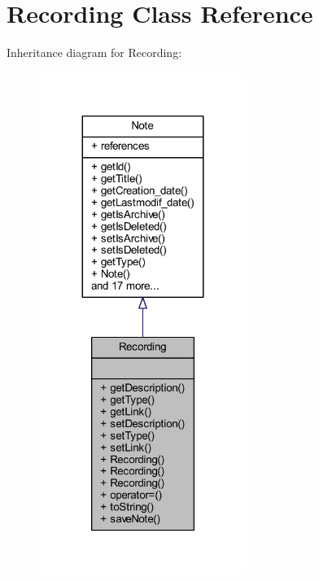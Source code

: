 \hypertarget{class_recording}{}\section{Recording Class Reference}
\label{class_recording}


Inheritance diagram for Recording\+:\nopagebreak
\begin{figure}[H]
\begin{center}
\leavevmode
\includegraphics[width=191pt]{class_recording__inherit__graph}
\end{center}
\end{figure}


